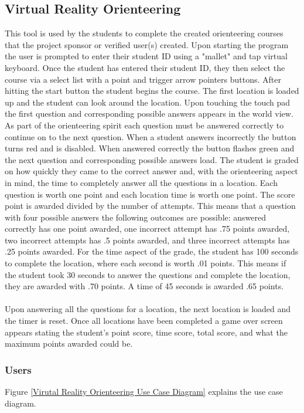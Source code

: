 \subsection{Virtual Reality Orienteering}
This tool is used by the students to complete the created orienteering courses that the project sponsor or verified user(s) created. Upon starting the program the user is prompted to enter their student ID using a "mallet" and tap virtual keyboard. Once the student has entered their student ID, they then select the course via a select list with a point and trigger arrow pointers buttons. After hitting the start button the student begins the course. The first location is loaded up and the student can look around the location. Upon touching the touch pad the first question and corresponding possible answers appears in the world view. As part of the orienteering spirit each question must be answered correctly to continue on to the next question. When a student answers incorrectly the button turns red and is disabled. When answered correctly the button flashes green and the next question and corresponding possible answers load. The student is graded on how quickly they came to the correct answer and, with the orienteering aspect in mind, the time to completely answer all the questions in a location. Each question is worth one point and each location time is worth one point. The score point is awarded divided by the number of attempts. This means that a question with four possible answers the following outcomes are possible: answered correctly has one point awarded, one incorrect attempt has .75 points awarded, two incorrect attempts has .5 points awarded, and three incorrect attempts has .25 points awarded. For the time aspect of the grade, the student has 100 seconds to complete the location, where each second is worth .01 points. This means if the student took 30 seconds to answer the questions and complete the location, they are awarded with .70 points. A time of 45 seconds is awarded .65 points. \\
\\
Upon answering all the questions for a location, the next location is loaded and the timer is reset. Once all locations have been completed a game over screen appears stating the student's point score, time score, total score, and what the maximum points awarded could be. 
\subsubsection{Users}
Figure \ref{Virutal Reality Orienteering Use Case Diagram} explains the use case diagram.

